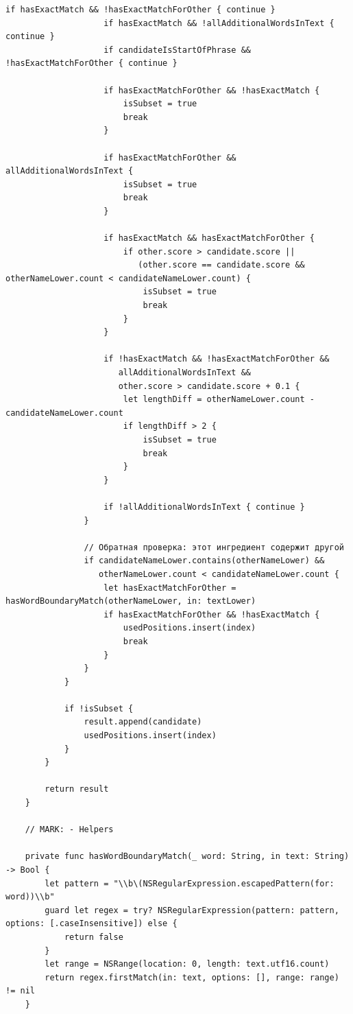 \begin{lstlisting}[basicstyle=\tiny\ttfamily,breaklines=true]
                    if hasExactMatch && !hasExactMatchForOther { continue }
                    if hasExactMatch && !allAdditionalWordsInText { continue }
                    if candidateIsStartOfPhrase && !hasExactMatchForOther { continue }

                    if hasExactMatchForOther && !hasExactMatch {
                        isSubset = true
                        break
                    }

                    if hasExactMatchForOther && allAdditionalWordsInText {
                        isSubset = true
                        break
                    }

                    if hasExactMatch && hasExactMatchForOther {
                        if other.score > candidate.score ||
                           (other.score == candidate.score && otherNameLower.count < candidateNameLower.count) {
                            isSubset = true
                            break
                        }
                    }

                    if !hasExactMatch && !hasExactMatchForOther &&
                       allAdditionalWordsInText &&
                       other.score > candidate.score + 0.1 {
                        let lengthDiff = otherNameLower.count - candidateNameLower.count
                        if lengthDiff > 2 {
                            isSubset = true
                            break
                        }
                    }

                    if !allAdditionalWordsInText { continue }
                }

                // Обратная проверка: этот ингредиент содержит другой
                if candidateNameLower.contains(otherNameLower) &&
                   otherNameLower.count < candidateNameLower.count {
                    let hasExactMatchForOther = hasWordBoundaryMatch(otherNameLower, in: textLower)
                    if hasExactMatchForOther && !hasExactMatch {
                        usedPositions.insert(index)
                        break
                    }
                }
            }

            if !isSubset {
                result.append(candidate)
                usedPositions.insert(index)
            }
        }

        return result
    }

    // MARK: - Helpers

    private func hasWordBoundaryMatch(_ word: String, in text: String) -> Bool {
        let pattern = "\\b\(NSRegularExpression.escapedPattern(for: word))\\b"
        guard let regex = try? NSRegularExpression(pattern: pattern, options: [.caseInsensitive]) else {
            return false
        }
        let range = NSRange(location: 0, length: text.utf16.count)
        return regex.firstMatch(in: text, options: [], range: range) != nil
    }


\end{lstlisting}
